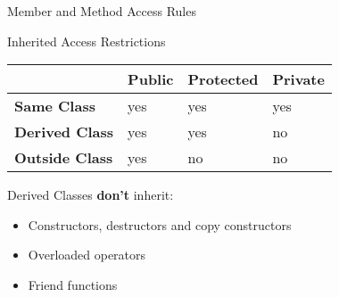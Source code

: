 \documentclass[xcolor={dvipsnames}]{beamer}
\begin{document}
\begin{frame}{Member and Method Access Rules}
	\begin{block}{Inherited Access Restrictions}
	\begin{center}
	\begin{tabular}{l|l|l|l}
		  & \textbf{Public} & \textbf{Protected} & \textbf{Private}\\\hline
		\textbf{Same Class} & yes & yes & yes\\
		\textbf{Derived Class} & yes & yes & no\\
		\textbf{Outside Class} & yes & no & no\\
	\end{tabular}
	\end{center}
	\end{block}
\pause
\begin{block}{Derived Classes \textbf{don't} inherit:}
	\begin{itemize}
		\item Constructors, destructors and copy constructors
		\item Overloaded operators
		\item Friend functions
	\end{itemize}
\end{block}
\end{frame}
\end{document}
